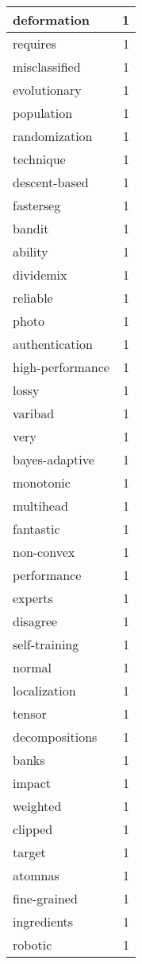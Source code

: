 \begin{table}[h]
\begin{tabular}{|l|r|}
\hline
deformation & 1 \\
\hline
requires & 1 \\
\hline
misclassified & 1 \\
\hline
evolutionary & 1 \\
\hline
population & 1 \\
\hline
randomization & 1 \\
\hline
technique & 1 \\
\hline
descent-based & 1 \\
\hline
fasterseg & 1 \\
\hline
bandit & 1 \\
\hline
ability & 1 \\
\hline
dividemix & 1 \\
\hline
reliable & 1 \\
\hline
photo & 1 \\
\hline
authentication & 1 \\
\hline
high-performance & 1 \\
\hline
lossy & 1 \\
\hline
varibad & 1 \\
\hline
very & 1 \\
\hline
bayes-adaptive & 1 \\
\hline
monotonic & 1 \\
\hline
multihead & 1 \\
\hline
fantastic & 1 \\
\hline
non-convex & 1 \\
\hline
performance & 1 \\
\hline
experts & 1 \\
\hline
disagree & 1 \\
\hline
self-training & 1 \\
\hline
normal & 1 \\
\hline
localization & 1 \\
\hline
tensor & 1 \\
\hline
decompositions & 1 \\
\hline
banks & 1 \\
\hline
impact & 1 \\
\hline
weighted & 1 \\
\hline
clipped & 1 \\
\hline
target & 1 \\
\hline
atomnas & 1 \\
\hline
fine-grained & 1 \\
\hline
ingredients & 1 \\
\hline
robotic & 1 \\

\end{tabular}
\end{table}
